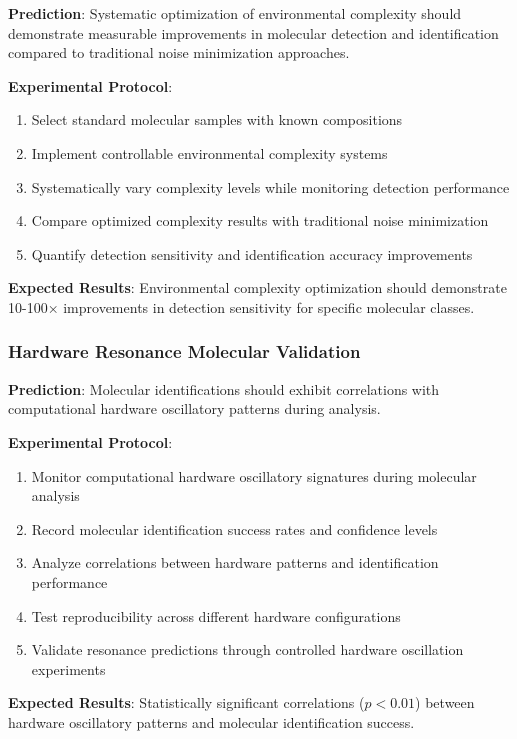 \documentclass[11pt,a4paper]{article}
\theoremstyle{remark}
\begin{document}
\textbf{Prediction}: Systematic optimization of environmental complexity should demonstrate measurable improvements in molecular detection and identification compared to traditional noise minimization approaches.

\textbf{Experimental Protocol}:
\begin{enumerate}
\item Select standard molecular samples with known compositions
\item Implement controllable environmental complexity systems
\item Systematically vary complexity levels while monitoring detection performance
\item Compare optimized complexity results with traditional noise minimization
\item Quantify detection sensitivity and identification accuracy improvements
\end{enumerate}

\textbf{Expected Results}: Environmental complexity optimization should demonstrate 10-100× improvements in detection sensitivity for specific molecular classes.

\subsubsection{Hardware Resonance Molecular Validation}

\textbf{Prediction}: Molecular identifications should exhibit correlations with computational hardware oscillatory patterns during analysis.

\textbf{Experimental Protocol}:
\begin{enumerate}
\item Monitor computational hardware oscillatory signatures during molecular analysis
\item Record molecular identification success rates and confidence levels
\item Analyze correlations between hardware patterns and identification performance
\item Test reproducibility across different hardware configurations
\item Validate resonance predictions through controlled hardware oscillation experiments
\end{enumerate}

\textbf{Expected Results}: Statistically significant correlations ($p < 0.01$) between hardware oscillatory patterns and molecular identification success.
\end{document}
